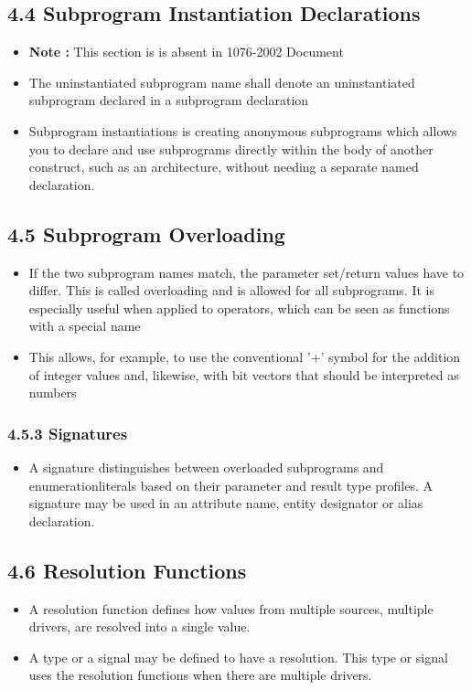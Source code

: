 \documentclass[a4paper,12pt]{article}
\begin{document}
	\subsection*{4.4 Subprogram Instantiation Declarations}
	\begin{itemize}
		\item \textbf{Note :} This section is is absent in 1076-2002 Document
		\item The uninstantiated subprogram name shall denote an uninstantiated subprogram declared in a subprogram	declaration
		\item Subprogram instantiations is creating anonymous subprograms which allows you to declare and use subprograms  directly within the body of another construct, such as an architecture, without needing a separate named declaration.
	\end{itemize}
	
	\subsection*{4.5 Subprogram Overloading}
	\begin{itemize}
		\item  If the two subprogram names match, the parameter set/return values have to differ. This is called overloading and is allowed for all subprograms. It is especially useful when applied to operators, which can be seen as functions with a special name
		\item This allows, for example, to use the conventional ’+’ symbol for the addition of integer values and, likewise, with bit vectors that should be interpreted as numbers
	\end{itemize}
	
	\subsubsection*{4.5.3 Signatures}
	\begin{itemize}
		\item A signature distinguishes between overloaded subprograms and enumerationliterals based on their parameter and result type profiles. A signature may be used in an attribute name, entity designator or alias declaration.
	\end{itemize}
	
	\subsection*{4.6 Resolution Functions}
	\begin{itemize}
		\item A resolution function defines how values from multiple sources, multiple drivers, are resolved into a single value.
		\item A type or a signal may be defined to have a resolution. This type or signal uses the resolution functions when there are multiple drivers.
	\end{itemize}
	
\end{document}

